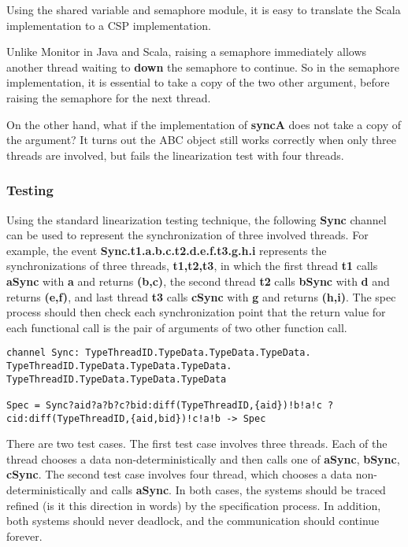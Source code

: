 \documentclass{article}
\begin{document}
Using the shared variable and semaphore module, it is easy to translate the Scala implementation to a CSP implementation. 

Unlike Monitor in Java and Scala, raising a semaphore immediately allows another thread waiting to \textbf{down} the semaphore to continue. So in the semaphore implementation, it is essential to take a copy of the two other argument, before raising the semaphore for the next thread. 

On the other hand, what if the implementation of \textbf{syncA} does not take a copy of the argument? It turns out the ABC object still works correctly when only three threads are involved, but fails the linearization test with four threads.

\subsubsection{Testing}
Using the standard linearization testing technique, the following \textbf{Sync} channel can be used to represent the synchronization of three involved threads. For example, the event \textbf{Sync.t1.a.b.c.t2.d.e.f.t3.g.h.i} represents the synchronizations of three threads, \textbf{t1,t2,t3}, in which the first thread \textbf{t1} calls \textbf{aSync} with \textbf{a} and returns \textbf{(b,c)}, the second thread \textbf{t2} calls \textbf{bSync} with \textbf{d} and returns \textbf{(e,f)}, and last thread \textbf{t3} calls \textbf{cSync} with \textbf{g} and returns \textbf{(h,i)}. The spec process should then check each synchronization point that the return value for each functional call is the pair of arguments of two other function call.

\begin{verbatim}
channel Sync: TypeThreadID.TypeData.TypeData.TypeData. TypeThreadID.TypeData.TypeData.TypeData. TypeThreadID.TypeData.TypeData.TypeData

Spec = Sync?aid?a?b?c?bid:diff(TypeThreadID,{aid})!b!a!c ?cid:diff(TypeThreadID,{aid,bid})!c!a!b -> Spec
\end{verbatim}

There are two test cases. The first test case involves three threads. Each of the thread chooses a data non-deterministically and then calls one of \textbf{aSync}, \textbf{bSync}, \textbf{cSync}. The second test case involves four thread, which chooses a data non-deterministically and calls \textbf{aSync}. In both cases, the systems should be traced refined (is it this direction in words) by the specification process. In addition, both systems should never deadlock, and the communication should continue forever.
\end{document}
